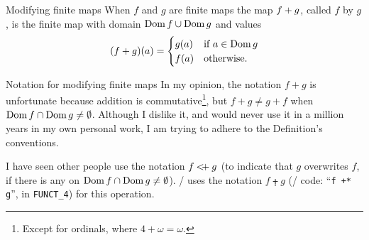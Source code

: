 \begin{definition}{Modifying finite maps}\label{defn:static-core:modifying-finite-maps}
When $f$ and $g$ are finite maps the map $f + g$, called
$f$  by $g$, is the finite map with domain
$\mathop{\rm Dom}\nolimits f \cup \mathop{\rm Dom}\nolimits g$ and values
\begin{equation*}
  (f + g)(a) = \begin{cases}g(a) & \mbox{if $a\in\mathop{\rm Dom}\nolimits g$}\\
    f(a) & \mbox{otherwise}.
  \end{cases}
\end{equation*}
\end{definition}

\begin{remark}{Notation for modifying finite maps}
In my opinion, the notation $f+g$ is unfortunate because addition is
commutative\footnote{Except for ordinals, where $4+\omega=\omega$.}, but $f+g\neq g+f$ when
$\mathop{\rm Dom}\nolimits f\cap\mathop{\rm Dom}\nolimits g\neq\emptyset$. Although I dislike it, and would never
use it in a million years in my own personal work, I am trying to adhere
to the Definition's conventions.

I have seen other people use the notation $f\mathbin{{<}\mskip-4mu{+}}g$ (to indicate
that $g$ overwrites $f$, if there is any on $\mathop{\rm Dom}\nolimits f\cap\mathop{\rm Dom}\nolimits g\neq\emptyset$).
\Mizar/ uses the notation $f\plusdot g$ (\Mizar/ code: ``\verb|f +* g|'', in
\verb|FUNCT_4|) for this operation.
\end{remark}

